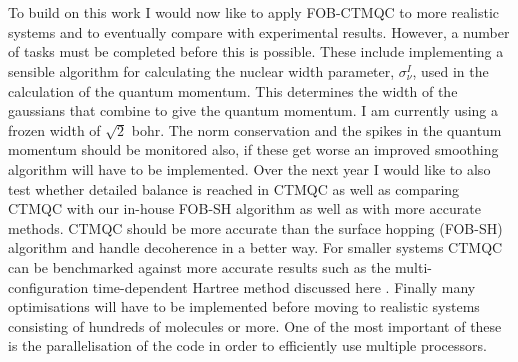 \\\\
To build on this work I would now like to apply FOB-CTMQC to more realistic systems and to eventually compare with experimental results. However, a number of tasks must be completed before this is possible. These include implementing a sensible algorithm for calculating the nuclear width parameter, $\sigma_{\nu}^{I}$, used in the calculation of the quantum momentum. This determines the width of the gaussians that combine to give the quantum momentum. I am currently using a frozen width of $\sqrt{2}$ bohr. The norm conservation and the spikes in the quantum momentum should be monitored also, if these get worse an improved smoothing algorithm will have to be implemented. Over the next year I would like to also test whether detailed balance is reached in CTMQC as well as comparing CTMQC with our in-house FOB-SH algorithm as well as with more accurate methods. CTMQC should be more accurate than the surface hopping (FOB-SH) algorithm and handle decoherence in a better way. For smaller systems CTMQC can be benchmarked against more accurate results such as the multi-configuration time-dependent Hartree method discussed here \cite{cattarius_all_2001}. Finally many optimisations will have to be implemented before moving to realistic systems consisting of hundreds of molecules or more. One of the most important of these is the parallelisation of the code in order to efficiently use multiple processors.
